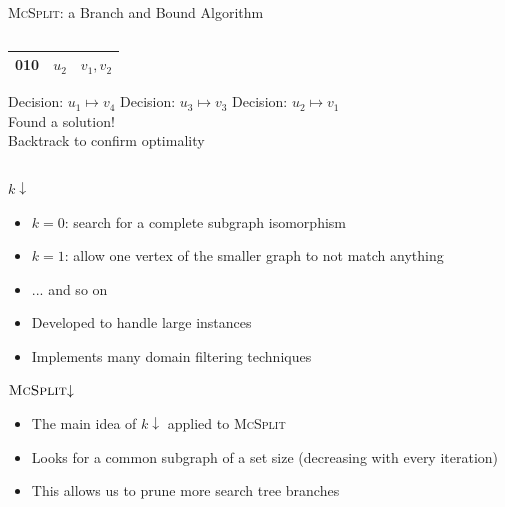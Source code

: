 \documentclass{beamer}
\begin{document}
\begin{frame}{\textsc{McSplit}: a Branch and Bound Algorithm}
\begin{columns}
\begin{column}{0.5\textwidth}
\begin{table}
\begin{overlayarea}{\textwidth}{2cm}
{\begin{tabular}{c c c}
              \midrule
              010 & $u_2$ & $v_1, v_2$ \\
              \bottomrule
            \end{tabular}
          }
        \end{overlayarea}
      \end{table}
      \begin{overprint}
        Decision: $u_1 \mapsto v_4$
        Decision: $u_3 \mapsto v_3$
        Decision: $u_2 \mapsto v_1$\\ Found a solution! \\ Backtrack to confirm optimality
      \end{overprint}
    \end{column}
  \end{columns}
\end{frame}

\begin{frame}{$k{\downarrow}$}
  \begin{itemize}
  \item $k = 0$: search for a complete subgraph isomorphism
  \item $k = 1$: allow one vertex of the smaller graph to not match anything
  \item ... and so on
  \item Developed to handle large instances
  \item Implements many domain filtering techniques
  \end{itemize}
\end{frame}

\begin{frame}{$\textsc{McSplit}{\downarrow}$}
  \begin{itemize}
  \item The main idea of $k{\downarrow}$ applied to \textsc{McSplit}
  \item Looks for a common subgraph of a set size (decreasing with
    every iteration)
  \item This allows us to prune more search tree branches
  \end{itemize}
\end{frame}
\end{document}
